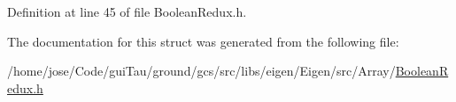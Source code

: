 Definition at line 45 of file Boolean\-Redux.\-h.



The documentation for this struct was generated from the following file\-:\begin{DoxyCompactItemize}
\item 
/home/jose/\-Code/gui\-Tau/ground/gcs/src/libs/eigen/\-Eigen/src/\-Array/\hyperlink{_boolean_redux_8h}{Boolean\-Redux.\-h}\end{DoxyCompactItemize}
